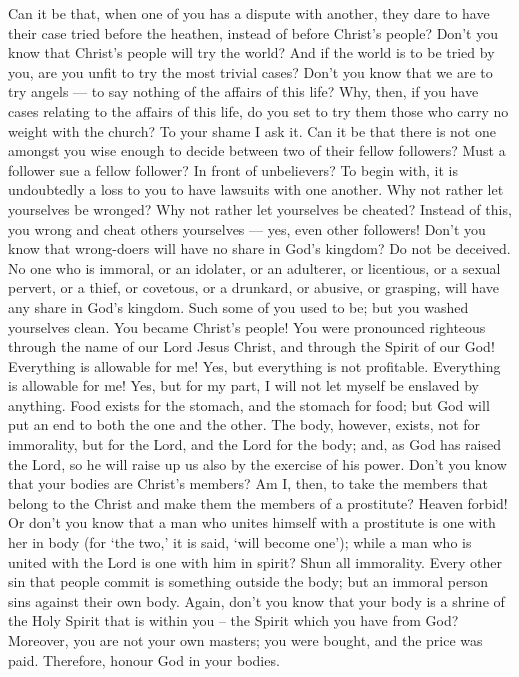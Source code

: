  Can it be that, when one of you has a dispute with another,
they dare to have their case tried before the heathen, instead of before
Christ's people?  Don't you know that Christ's people will
try the world? And if the world is to be tried by you, are you unfit to
try the most trivial cases?  Don't you know that we are to
try angels --- to say nothing of the affairs of this life? 
Why, then, if you have cases relating to the affairs of this life, do
you set to try them those who carry no weight with the church? To your
shame I ask it.  Can it be that there is not one amongst you
wise enough to decide between two of their fellow followers?
 Must a follower sue a fellow follower? In front of
unbelievers?  To begin with, it is undoubtedly a loss to you
to have lawsuits with one another. Why not rather let yourselves be
wronged? Why not rather let yourselves be cheated?  Instead
of this, you wrong and cheat others yourselves --- yes, even other
followers!  Don't you know that wrong-doers will have no
share in God's kingdom? Do not be deceived. No one who is immoral, or an
idolater, or an adulterer, or licentious, or a sexual pervert,
 or a thief, or covetous, or a drunkard, or abusive, or
grasping, will have any share in God's kingdom.  Such some
of you used to be; but you washed yourselves clean. You became Christ's
people! You were pronounced righteous through the name of our Lord Jesus
Christ, and through the Spirit of our God!  Everything is
allowable for me! Yes, but everything is not profitable. Everything is
allowable for me! Yes, but for my part, I will not let myself be
enslaved by anything.  Food exists for the stomach, and the
stomach for food; but God will put an end to both the one and the other.
The body, however, exists, not for immorality, but for the Lord, and the
Lord for the body;  and, as God has raised the Lord, so he
will raise up us also by the exercise of his power.  Don't
you know that your bodies are Christ's members? Am I, then, to take the
members that belong to the Christ and make them the members of a
prostitute? Heaven forbid!  Or don't you know that a man
who unites himself with a prostitute is one with her in body (for `the
two,' it is said, `will become one');  while a man who is
united with the Lord is one with him in spirit?  Shun all
immorality. Every other sin that people commit is something outside the
body; but an immoral person sins against their own body. 
Again, don't you know that your body is a shrine of the Holy Spirit that
is within you -- the Spirit which you have from God? 
Moreover, you are not your own masters; you were bought, and the price
was paid. Therefore, honour God in your bodies.

